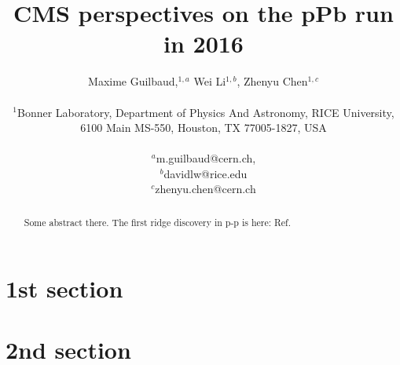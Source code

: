 \documentclass[12pt]{article}
\title{CMS perspectives on the pPb run in 2016}
\author
{Maxime Guilbaud,$^{1,a}$ Wei Li$^{1,b}$, Zhenyu Chen$^{1,c}$\\
\\
\normalsize{$^{1}$Bonner Laboratory, Department of Physics And Astronomy, RICE University,}\\
\normalsize{6100 Main MS-550, Houston, TX 77005-1827, USA}\\
\\
\normalsize{$^{a}$m.guilbaud@cern.ch, }\\
\normalsize{$^{b}$davidlw@rice.edu}\\
\normalsize{$^{c}$zhenyu.chen@cern.ch}\\
}
\date{}
\begin{document}
 


\baselineskip24pt


\maketitle 


\begin{abstract}

Some abstract there. The first ridge discovery in p-p is here: Ref.~\cite{Khachatryan:2010gv}

\end{abstract}


\section{1st section}
\section{2nd section}





\clearpage
\end{document}
